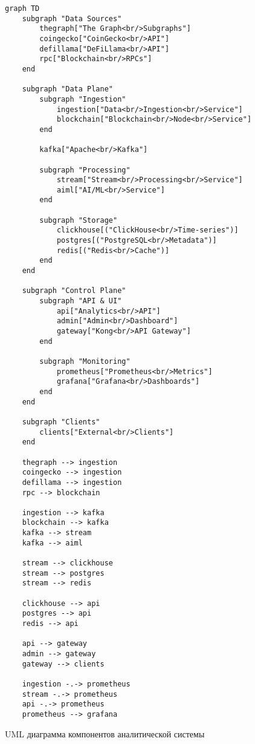 \documentclass[11pt,a4paper]{article}
\begin{document}
\begin{figure}[H]
\centering
\begin{verbatim}
graph TD
    subgraph "Data Sources"
        thegraph["The Graph<br/>Subgraphs"]
        coingecko["CoinGecko<br/>API"]
        defillama["DeFiLlama<br/>API"]
        rpc["Blockchain<br/>RPCs"]
    end

    subgraph "Data Plane"
        subgraph "Ingestion"
            ingestion["Data<br/>Ingestion<br/>Service"]
            blockchain["Blockchain<br/>Node<br/>Service"]
        end
        
        kafka["Apache<br/>Kafka"]
        
        subgraph "Processing"
            stream["Stream<br/>Processing<br/>Service"]
            aiml["AI/ML<br/>Service"]
        end
        
        subgraph "Storage"
            clickhouse[("ClickHouse<br/>Time-series")]
            postgres[("PostgreSQL<br/>Metadata")]
            redis[("Redis<br/>Cache")]
        end
    end

    subgraph "Control Plane"
        subgraph "API & UI"
            api["Analytics<br/>API"]
            admin["Admin<br/>Dashboard"]
            gateway["Kong<br/>API Gateway"]
        end
        
        subgraph "Monitoring"
            prometheus["Prometheus<br/>Metrics"]
            grafana["Grafana<br/>Dashboards"]
        end
    end

    subgraph "Clients"
        clients["External<br/>Clients"]
    end

    thegraph --> ingestion
    coingecko --> ingestion
    defillama --> ingestion
    rpc --> blockchain
    
    ingestion --> kafka
    blockchain --> kafka
    kafka --> stream
    kafka --> aiml
    
    stream --> clickhouse
    stream --> postgres
    stream --> redis
    
    clickhouse --> api
    postgres --> api
    redis --> api
    
    api --> gateway
    admin --> gateway
    gateway --> clients
    
    ingestion -.-> prometheus
    stream -.-> prometheus
    api -.-> prometheus
    prometheus --> grafana
\end{verbatim}
\caption{UML диаграмма компонентов аналитической системы}
\label{fig:component-diagram}
\end{figure}
\end{document}
